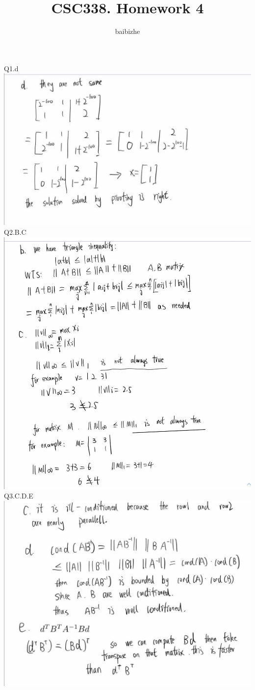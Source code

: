 \documentclass[18pt]{article}
\author{baibizhe}
\title{CSC338. Homework 4
}
\begin{document}
\maketitle
\vspace{1.5cm}
\noindent
Q1.d\\
    \includegraphics[scale=0.5]{q1d.jpg}\\
    Q2.B.C\\
    \includegraphics[scale=0.5]{q2bc.jpg}\\
    Q3.C.D.E\\
    \includegraphics[scale=0.5]{q3cde.jpg}\\
\end{document}
